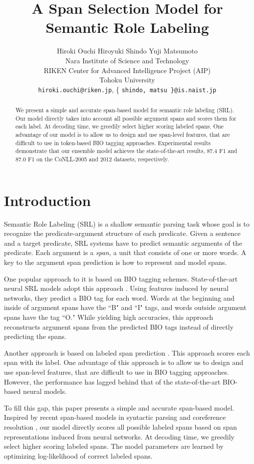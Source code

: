 \documentclass[11pt,a4paper]{article}
\title{A Span Selection Model for Semantic Role Labeling}
\author{Hiroki Ouchi \hspace{0.7cm} Hiroyuki Shindo \hspace{0.7cm} Yuji Matsumoto\\
  { Nara Institute of Science and Technology}\\
  { RIKEN Center for Advanced Intelligence Project (AIP)}\\
  { Tohoku University}\\
  {\tt hiroki.ouchi@riken.jp}, \{ {\tt shindo, matsu \}@is.naist.jp}}
\date{}
\begin{document}
\maketitle
\begin{abstract}
We present a simple and accurate span-based model for semantic role labeling (SRL).
Our model directly takes into account all possible argument spans and scores them for each label.
At decoding time, we greedily select higher scoring labeled spans.
One advantage of our model is to allow us to design and use span-level features, that are difficult to use in token-based BIO tagging approaches.
Experimental results demonstrate that our ensemble model achieves the state-of-the-art results, 87.4 F1 and 87.0 F1 on the CoNLL-2005 and 2012 datasets, respectively.
\end{abstract}

\section{Introduction}
\label{sec:intro}
Semantic Role Labeling (SRL) is a shallow semantic parsing task whose goal is to recognize the predicate-argument structure of each predicate.
Given a sentence and a target predicate, SRL systems have to predict semantic arguments of the predicate.
Each argument is a {\it span}, a unit that consists of one or more words.
A key to the argument span prediction is how to represent and model spans.

One popular approach to it is based on BIO tagging schemes.
State-of-the-art neural SRL models adopt this approach \cite{zhou:15,he:17,tan:18}.
Using features induced by neural networks, they predict a BIO tag for each word.
Words at the beginning and inside of argument spans have the ``B" and ``I" tags, and words outside argument spans have the tag ``O."
While yielding high accuracies, this approach reconstructs argument spans from the predicted BIO tags instead of directly predicting the spans.

Another approach is based on labeled span prediction \cite{oscar:15,fitzgerald:15}.
This approach scores each span with its label.
One advantage of this approach is to allow us to design and use span-level features, that are difficult to use in BIO tagging approaches.
However, the performance has lagged behind that of the state-of-the-art BIO-based neural models.

To fill this gap, this paper presents a simple and accurate span-based model.
Inspired by recent span-based models in syntactic parsing and coreference resolution \cite{stern:17,lee:17},  our model directly scores all possible labeled spans based on span representations induced from neural networks.
At decoding time, we greedily select higher scoring labeled spans.
The model parameters are learned by optimizing log-likelihood of correct labeled spans.
\end{document}
